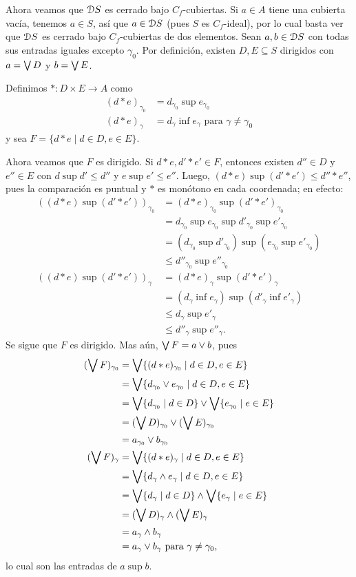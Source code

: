 Ahora veamos que $\mathcal D S$ es cerrado bajo $C_f$-cubiertas.
Si $a\in A$ tiene una cubierta vacía, tenemos $a\in S$, así que
$a\in\mathcal D S$ (pues $S$ es $C_f$-ideal),
por lo cual basta ver que $\mathcal D S$ es cerrado
bajo $C_f$-cubiertas de dos elementos.
Sean $a,b\in\mathcal D S$ con todas sus entradas iguales excepto
$\gamma_0$.
Por definición, existen $D,E\subseteq S$ dirigidos con
$a=\bigvee D$ y $b=\bigvee E$.

Definimos $*:D\times E\to A$ como
\begin{align*}
  (d*e)_{\gamma_0} &= d_{\gamma_0} \sup e_{\gamma_0} \\
  (d*e)_{\gamma} &= d_{\gamma} \inf e_{\gamma} \text{ para }
  \gamma\neq\gamma_0
\end{align*}
y sea $F=\{d*e \mid d\in D, e\in E\}$.

Ahora veamos que $F$ es dirigido.
Si $d*e,d'*e'\in F$, entonces existen $d''\in D$ y $e''\in E$ con
$d\sup d'\leq d''$ y $e\sup e'\leq e''$.
Luego, $(d*e)\sup(d'*e')\leq d''*e''$, pues la comparación es
puntual y $*$ es monótono en cada coordenada; en efecto:
\begin{align*}
  ((d*e)\sup(d'*e'))_{\gamma_0}
  &= (d*e)_{\gamma_0} \sup (d'*e')_{\gamma_0} \\
  &= d_{\gamma_0}\sup e_{\gamma_0}\sup d'_{\gamma_0}\sup
    e'_{\gamma_0} \\
  &= (d_{\gamma_0}\sup d'_{\gamma_0})
    \sup(e_{\gamma_0}\sup e'_{\gamma_0}) \\
  &\leq d''_{\gamma_0} \sup e''_{\gamma_0}
  \\
  ((d*e)\sup(d'*e'))_{\gamma}
  &= (d*e)_{\gamma} \sup (d'*e')_{\gamma} \\
  &= (d_\gamma\inf e_\gamma)\sup(d'_\gamma\inf e'_\gamma) \\
  &\leq d_\gamma \sup e'_\gamma \\
  &\leq d''_\gamma \sup e''_\gamma.
\end{align*}
Se sigue que $F$ es dirigido.
Mas aún, $\bigvee F = a\vee b$, pues
\begin{align*}
  (\bigvee F)_{\gamma_0}
  &= \bigvee\{(d*e)_{\gamma_0} \mid d\in D,e\in E\} \\
  &= \bigvee\{d_{\gamma_0}\vee e_{\gamma_0} \mid d\in D,e\in E\} \\
  &= \bigvee\{d_{\gamma_0}\mid d\in D\}
    \vee \bigvee\{e_{\gamma_0}\mid e\in E\} \\
  &= (\bigvee D)_{\gamma_0} \vee (\bigvee E)_{\gamma_0} \\
  &= a_{\gamma_0} \vee b_{\gamma_0}
  \\
  (\bigvee F)_\gamma
  &= \bigvee\{(d*e)_\gamma\mid d\in D,e\in E\} \\
  &= \bigvee\{d_\gamma\wedge e_\gamma\mid d\in D,e\in E\} \\
  &= \bigvee\{d_\gamma\mid d\in D\}
    \wedge \bigvee\{e_\gamma\mid e\in E\} \\
  &= (\bigvee D)_\gamma \wedge (\bigvee E)_\gamma \\
  &= a_\gamma \wedge b_\gamma \\
  &= a_\gamma \vee b_\gamma \text{ para }\gamma\neq\gamma_0,
\end{align*}
lo cual son las entradas de $a\sup b$.

